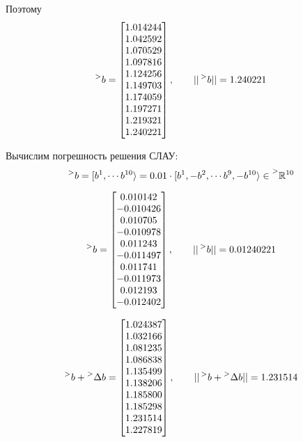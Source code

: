 \documentclass[14pt,a4paper]{scrartcl}
\begin{document}
Поэтому
\begin{equation*}
\prescript{>}{}{b} = 
	\begin{bmatrix}{}
	1.014244 \\ 
	1.042592 \\ 
	1.070529 \\ 
	1.097816 \\ 
	1.124256 \\ 
	1.149703 \\ 
	1.174059 \\ 
	1.197271 \\ 
	1.219321 \\ 
	1.240221 \\ 
	\end{bmatrix},
	\qquad ||\prescript{>}{}{b}|| = 1.240221
\end{equation*}


Вычислим погрешность решения СЛАУ:
\begin{equation*}
	\prescript{>}{}{b} = [b^1, \cdots b^{10}\rangle = 0.01 \cdot [b^1, -b^2, \cdots b^9, -b^{10}\rangle \in \prescript{>}{}{\mathbb{R}^{10}}
\end{equation*}

\begin{equation*}
	\prescript{>}{}{b} = 
	\begin{bmatrix}{}
	0.010142 \\ 
	-0.010426 \\ 
	0.010705 \\ 
	-0.010978 \\ 
	0.011243 \\ 
	-0.011497 \\ 
	0.011741 \\ 
	-0.011973 \\ 
	0.012193 \\ 
	-0.012402 \\ 
	\end{bmatrix},
	\qquad ||\prescript{>}{}{b}|| = 0.01240221
\end{equation*}

\begin{equation*}
	\prescript{>}{}{b} + \prescript{>}{}{\Delta b} = 
	\begin{bmatrix}{}
	1.024387 \\ 
	1.032166 \\ 
	1.081235 \\ 
	1.086838 \\ 
	1.135499 \\ 
	1.138206 \\ 
	1.185800 \\ 
	1.185298 \\ 
	1.231514 \\ 
	1.227819 \\ 
	\end{bmatrix},
	\qquad ||\prescript{>}{}{b} + \prescript{>}{}{\Delta b}|| = 1.231514
\end{equation*}
\\
\end{document}
